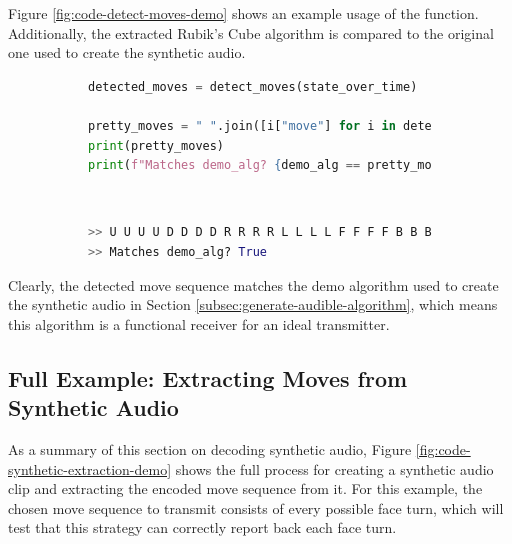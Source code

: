 Figure \ref{fig:code-detect-moves-demo} shows an example usage of the
 function. Additionally, the extracted Rubik's Cube
algorithm is compared to the original one used to create the synthetic
audio.

\begin{figure}[h]
\caption{Example move sequence extraction}
\label{fig:code-detect-moves-demo} 
\begin{subfigure}{\textwidth}
\begin{lstlisting}[language=Python]
detected_moves = detect_moves(state_over_time)

pretty_moves = " ".join([i["move"] for i in detected_moves])
print(pretty_moves)   
print(f"Matches demo_alg? {demo_alg == pretty_moves}") 
\end{lstlisting}
\end{subfigure}\\

\begin{subfigure}{\textwidth}
\begin{lstlisting}[language=Python, numbers=none]
>> U U U U D D D D R R R R L L L L F F F F B B B B
>> Matches demo_alg? True
\end{lstlisting}
\end{subfigure}
\end{figure}

Clearly, the detected move sequence matches the demo algorithm used to
create the synthetic audio in Section
\ref{subsec:generate-audible-algorithm}, which means this algorithm is
a functional receiver for an ideal transmitter.

\subsection{Full Example: Extracting Moves from Synthetic Audio}

As a summary of this section on decoding synthetic audio, Figure
\ref{fig:code-synthetic-extraction-demo} shows the full process for
creating a synthetic audio clip and extracting the encoded move
sequence from it. For this example, the chosen move sequence to
transmit consists of every possible face turn, which will test that
this strategy can correctly report back each face turn.

